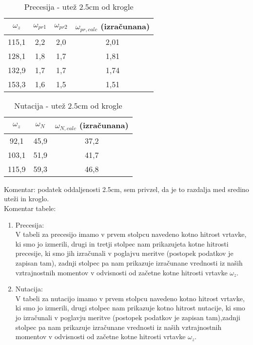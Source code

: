 \documentclass[11pt, a4paper]{article}
\theoremstyle{definition}
\theoremstyle{example}
\theoremstyle{izrek}
\begin{document}
\begin{table}[h]
	\centering
	\begin{tabular}{|c|c|c|c|}
		\hline
		\rule{0pt}{3ex}   
		$\omega_z$ & $\omega_{pr1}$\: & $\omega_{pr2}$\: & $\omega_{pr,calc}$\: (izračunana)\\
		\hline
		\hline
		115,1 &	2,2 &	2,0 &	2,01\\
		\hline
		128,1 &	1,8 &	1,7 &	1,81\\
		\hline
		132,9 &	1,7 &	1,7 &	1,74\\
		\hline
		153,3 &	1,6 &	1,5 &	1,51\\
		\hline
		
		
	\end{tabular}
	\caption{Precesija - utež 2.5cm od krogle}
\end{table}

\begin{table}[h]
	\centering
	\begin{tabular}{|c|c|c|}
		\hline
		\rule{0pt}{3ex}   
		$\omega_z$ & $\omega_{N}$ & $\omega_{N,calc}$\: (izračunana)\\
		\hline
		\hline
		92,1 &	45,9 &	37,2\\
		\hline
		103,1 &	51,9 &	41,7\\
		\hline
		115,9 &	59,3 &	46,8\\
		\hline
		
		
	\end{tabular}
	\caption{Nutacija - utež 2.5cm od krogle}
\end{table}
\vspace{2mm}
Komentar: podatek oddaljenosti 2.5cm, sem privzel, da je to razdalja med sredino uteži in kroglo.\\

Komentar tabele:
\begin{enumerate}
\item Precesija: \\
V tabeli za precesijo imamo v prvem stolpcu navedeno  kotno hitrost vrtavke, ki smo jo izmerili, drugi in tretji stolpec nam prikazujeta kotne hitrosti precesije, ki smo jih izračunali v poglajvu meritve (postopek podatkov je zapisan tam), zadnji stolpec pa nam prikazuje izračunane vrednosti iz naših vztrajnostnih momentov v odvisnosti od začetne kotne hitrosti vrtavke $\omega_z$.
\item Nutacija: \\
V tabeli za nutacijo imamo v prvem stolpcu navedeno kotno hitrost vrtavke, ki smo jo izmerili, drugi stolpec nam prikazuje kotno hitrost nutacije, ki smo jo izračunali v poglavju meritve (postopek podatkov je zapisan tam),zadnji stolpec pa nam prikazuje izračunane vrednosti iz naših vztrajnostnih momentov v odvisnosti od začetne kotne hitrosti vrtavke $\omega_z$.
\end{enumerate}
\end{document}
